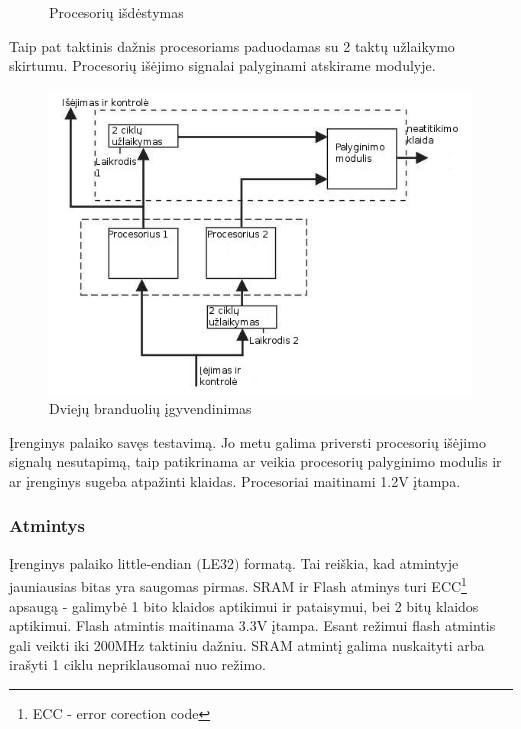 \documentclass[a4paper, 12pt]{article} %
\begin{document}
\begin{onehalfspacing}
\begin{figure}[H]
\caption{Procesori\k{u} i\v{s}d\.estymas}
\label{vienas}
\end{figure}
Taip pat taktinis da\v{z}nis procesoriams paduodamas su 2 takt\k{u} u\v{z}laikymo skirtumu. 
Procesori\k{u} i\v{s}\.ejimo signalai palyginami atskirame modulyje.
\begin{figure}[H] %
\centering %
\includegraphics[scale=2.8]{pav/impl.jpg} %
\captionsetup{labelformat=numbfirst} %
\captionsetup{labelseparator=tarpas}
\caption{Dviej\k{u} branduoli\k{u} \k{i}gyvendinimas}
\label{vienas}
\end{figure}
\k{I}renginys palaiko sav\k{e}s testavim\k{a}. Jo metu galima priversti procesori\k{u} i\v{s}\.ejimo signal\k{u} nesutapim\k{a}, taip patikrinama ar veikia procesori\k{u} palyginimo modulis ir ar \k{i}renginys sugeba atpa\v{z}inti klaidas. Procesoriai maitinami 1.2V \k{i}tampa. 


\subsubsection{Atmintys}
\k{I}renginys palaiko little-endian $($LE32$)$ format\k{a}. Tai rei\v{s}kia, kad atmintyje jauniausias bitas yra saugomas pirmas.
SRAM ir Flash atminys turi ECC\footnote{ECC - error corection code} apsaug\k{a} - galimyb\.e 1 bito klaidos aptikimui ir pataisymui, bei 2 bit\k{u} klaidos aptikimui. Flash atmintis maitinama 3.3V \k{i}tampa. Esant %
re\v{z}imui flash atmintis gali veikti iki 200MHz taktiniu da\v{z}niu. SRAM atmint\k{i} galima nuskaityti arba ira\v{s}yti 1 ciklu nepriklausomai nuo re\v{z}imo.   



\end{onehalfspacing}
\end{document}

